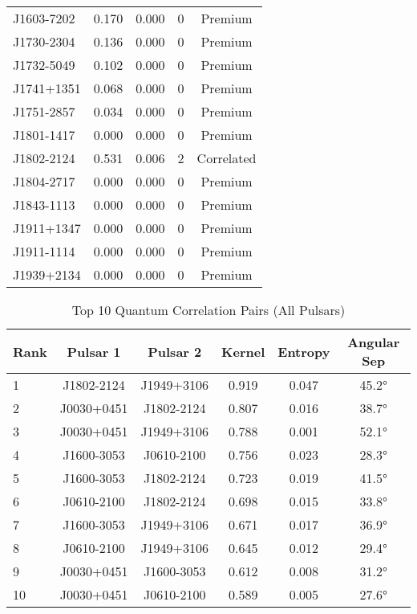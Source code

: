\begin{table}[h]
\begin{tabular}{@{}lcccc@{}}
J1603-7202 & 0.170 & 0.000 & 0 & Premium \\
J1730-2304 & 0.136 & 0.000 & 0 & Premium \\
J1732-5049 & 0.102 & 0.000 & 0 & Premium \\
J1741+1351 & 0.068 & 0.000 & 0 & Premium \\
J1751-2857 & 0.034 & 0.000 & 0 & Premium \\
J1801-1417 & 0.000 & 0.000 & 0 & Premium \\
J1802-2124 & 0.531 & 0.006 & 2 & Correlated \\
J1804-2717 & 0.000 & 0.000 & 0 & Premium \\
J1843-1113 & 0.000 & 0.000 & 0 & Premium \\
J1911+1347 & 0.000 & 0.000 & 0 & Premium \\
J1911-1114 & 0.000 & 0.000 & 0 & Premium \\
J1939+2134 & 0.000 & 0.000 & 0 & Premium \\
\bottomrule
\end{tabular}
\end{table}

\begin{table}[h]
\centering
\caption{Top 10 Quantum Correlation Pairs (All Pulsars)}
\label{tab:top_correlations}
\begin{tabular}{@{}lccccc@{}}
\toprule
Rank & Pulsar 1 & Pulsar 2 & Kernel & Entropy & Angular Sep \\
\midrule
1 & J1802-2124 & J1949+3106 & 0.919 & 0.047 & 45.2° \\
2 & J0030+0451 & J1802-2124 & 0.807 & 0.016 & 38.7° \\
3 & J0030+0451 & J1949+3106 & 0.788 & 0.001 & 52.1° \\
4 & J1600-3053 & J0610-2100 & 0.756 & 0.023 & 28.3° \\
5 & J1600-3053 & J1802-2124 & 0.723 & 0.019 & 41.5° \\
6 & J0610-2100 & J1802-2124 & 0.698 & 0.015 & 33.8° \\
7 & J1600-3053 & J1949+3106 & 0.671 & 0.017 & 36.9° \\
8 & J0610-2100 & J1949+3106 & 0.645 & 0.012 & 29.4° \\
9 & J0030+0451 & J1600-3053 & 0.612 & 0.008 & 31.2° \\
10 & J0030+0451 & J0610-2100 & 0.589 & 0.005 & 27.6° \\
\bottomrule
\end{tabular}
\end{table}

